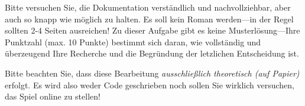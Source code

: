Bitte versuchen Sie, die Dokumentation verst\"andlich und nachvollziehbar, aber auch so knapp wie m\"oglich zu halten. Es soll
kein Roman werden---in der Regel sollten 2-4 Seiten ausreichen! Zu dieser Aufgabe gibt es keine
\glqq{}Musterl\"osung\grqq{}---Ihre Punktzahl (max. 10 Punkte) bestimmt sich daran, wie vollst\"andig und \"uberzeugend
Ihre Recherche und die Begr\"undung der letzlichen Entscheidung ist.
	
Bitte beachten Sie, dass diese Bearbeitung \emph{ausschlie\ss{}lich theoretisch (\glqq{}auf Papier\grqq{})} erfolgt. Es wird also
weder \glqq{}Code geschrieben\grqq{} noch sollen Sie wirklich versuchen, das Spiel \glqq{}online zu stellen\grqq{}! 
